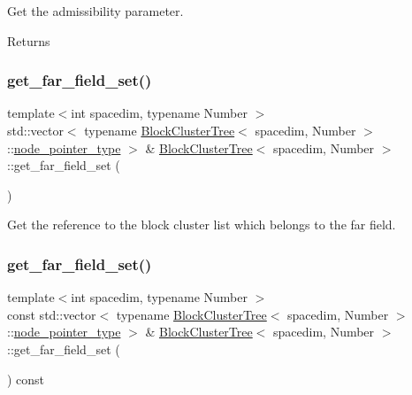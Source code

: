 Get the admissibility parameter. \begin{DoxyReturn}{Returns}

\end{DoxyReturn}
\mbox{\label{classBlockClusterTree_a2980726dc3789773b5cd3c04df5e69a3}} 
\subsubsection{\texorpdfstring{get\+\_\+far\+\_\+field\+\_\+set()}{get\_far\_field\_set()}\hspace{0.1cm}{\footnotesize\ttfamily [1/2]}}
{\footnotesize\ttfamily template$<$int spacedim, typename Number $>$ \\
std\+::vector$<$ typename \hyperlink{classBlockClusterTree}{Block\+Cluster\+Tree}$<$ spacedim, Number $>$\+::\hyperlink{classTreeNode}{node\+\_\+pointer\+\_\+type} $>$ \& \hyperlink{classBlockClusterTree}{Block\+Cluster\+Tree}$<$ spacedim, Number $>$\+::get\+\_\+far\+\_\+field\+\_\+set (\begin{DoxyParamCaption}{ }\end{DoxyParamCaption})}

Get the reference to the block cluster list which belongs to the far field. \mbox{\label{classBlockClusterTree_a93763855c84100e1a9da3080737295f4}} 
\subsubsection{\texorpdfstring{get\+\_\+far\+\_\+field\+\_\+set()}{get\_far\_field\_set()}\hspace{0.1cm}{\footnotesize\ttfamily [2/2]}}
{\footnotesize\ttfamily template$<$int spacedim, typename Number $>$ \\
const std\+::vector$<$ typename \hyperlink{classBlockClusterTree}{Block\+Cluster\+Tree}$<$ spacedim, Number $>$\+::\hyperlink{classTreeNode}{node\+\_\+pointer\+\_\+type} $>$ \& \hyperlink{classBlockClusterTree}{Block\+Cluster\+Tree}$<$ spacedim, Number $>$\+::get\+\_\+far\+\_\+field\+\_\+set (\begin{DoxyParamCaption}{ }\end{DoxyParamCaption}) const}

